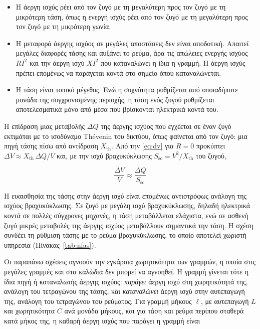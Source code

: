 \begin{itemize}
\item Η άεργη ισχύς ρέει από τον ζυγό με τη μεγαλύτερη προς τον ζυγό με τη μικρότερη τάση,
      όπως η ενεργή ισχύς ρέει από τον ζυγό με τη μεγαλύτερη προς τον ζυγό με τη μικρότερη
      γωνία.
\item Η μεταφορά άεργης ισχύος σε μεγάλες αποστάσεις δεν είναι αποδοτική. Απαιτεί μεγάλες
      διαφορές τάσης και αυξάνει το ρεύμα, άρα τις απώλειες ενεργής ισχύος $RI^2$ και την
      άεργη ισχύ $XI^2$ που καταναλώνει η ίδια η γραμμή. Η άεργη ισχύς πρέπει επομένως να
      παράγεται κοντά στο σημείο όπου καταναλώνεται.
\item Η τάση είναι τοπικό μέγεθος. Ενώ η συχνότητα ρυθμίζεται από οποιαδήποτε μονάδα της
      συγχρονισμένης περιοχής, η τάση ενός ζυγού ρυθμίζεται αποτελεσματικά μόνο από μέσα
      που βρίσκονται ηλεκτρικά κοντά του.
\end{itemize}

Η επίδραση μιας μεταβολής $\Delta Q$ της άεργης ισχύος που εγχέεται σε έναν ζυγό εκτιμάται με
το ισοδύναμο Thévenin του δικτύου, όπως φαίνεται από τον ζυγό: μια πηγή τάσης πίσω από
αντίδραση $X_{\mathrm{th}}$. Από την \eqref{eq:dv} για $R = 0$ προκύπτει
$\Delta V \approx X_{\mathrm{th}}\,\Delta Q / V$ και, με την ισχύ βραχυκύκλωσης
$S_{\mathrm{sc}} = V^2 / X_{\mathrm{th}}$ του ζυγού,

\begin{equation}
\frac{\Delta V}{V} \approx \frac{\Delta Q}{S_{\mathrm{sc}}}
\label{eq:dv-ssc}
\end{equation}

Η ευαισθησία της τάσης στην άεργη ισχύ είναι επομένως αντιστρόφως ανάλογη της ισχύος
βραχυκύκλωσης. Σε ζυγό με μεγάλη ισχύ βραχυκύκλωσης, δηλαδή ηλεκτρικά κοντά σε πολλές
σύγχρονες μηχανές, η τάση μεταβάλλεται ελάχιστα, ενώ σε ασθενή ζυγό μικρές μεταβολές της
άεργης ισχύος μεταβάλλουν σημαντικά την τάση. Η σχέση συνδέει τη ρύθμιση τάσης με το ρεύμα
βραχυκύκλωσης, το οποίο αποτελεί χωριστή υπηρεσία (Πίνακας~\ref{tab:nfas}).

Οι παραπάνω σχέσεις αγνοούν την εγκάρσια χωρητικότητα των γραμμών, η οποία στις μεγάλες
γραμμές και στα καλώδια δεν μπορεί να αγνοηθεί. Η γραμμή γίνεται τότε η ίδια πηγή ή καταναλωτής
άεργης ισχύος: \emph{παράγει} άεργη ισχύ στη χωρητικότητά της, ανάλογη του τετραγώνου της
τάσης, και \emph{καταναλώνει} άεργη ισχύ στην αυτεπαγωγή της, ανάλογη του τετραγώνου του
ρεύματος. Για γραμμή μήκους $\ell$, με αυτεπαγωγή $L$ και χωρητικότητα $C$ ανά μονάδα μήκους,
και για τάση και ρεύμα περίπου σταθερά κατά μήκος της, η καθαρή άεργη ισχύς που παράγει η
γραμμή είναι

